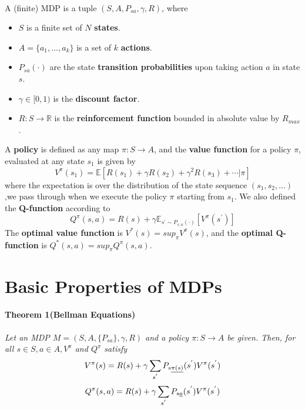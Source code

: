 \documentclass[12pt,a4paper]{article}
\begin{document}
\paragraph{} A (finite) MDP is a tuple $(S, A, {P_{sa}}, \gamma, R)$, where
\begin{itemize}
	\item $S$ is a finite set of $N$ \textbf{states}.
	\item $A = \{a_{1}, ..., a_{k}\}$ is a set of $k$ \textbf{actions}.
	\item $P_{sa}(\cdot)$ are the state \textbf{transition probabilities} upon taking action $a$ in state $s$.
	\item $\gamma \in [0, 1)$ is the \textbf{discount factor}.
	\item $R : S \rightarrow \mathbb{R}$ is the \textbf{reinforcement function} bounded in absolute value by $R_{max}$.
\end{itemize}
A \textbf{policy} is defined as any map $\pi : S \rightarrow A$, and the \textbf{value function} for a policy $\pi$, evaluated at any state $s_{1}$ is given by 
\begin{equation}
V^{\pi}(s_{1}) = \mathbb{E}[R(s_{1}) + \gamma R(s_{2}) + \gamma^{2} R(s_{3}) + \cdots | \pi]
\end{equation}
where the expectation is over the distribution of the state sequence $(s_1, s_2, ...)$,we pass through when we execute the policy $\pi$ starting from $s_1$. We also defined the \textbf{Q-function} according to 
\begin{equation}
	Q^{\pi}(s,a) = R(s) + \gamma \mathbb{E}_{s^{'} \sim P_{s,a}(\cdot)}[V^{\pi}(s^{'})]
\end{equation}
The \textbf{optimal value function} is $V^{*}(s) = sup_{\pi}V^{\pi}(s)$, and the \textbf{optimal Q-function} is $Q^{*}(s,a)= sup_{\pi}Q^{\pi}(s,a)$.
\section{Basic Properties of MDPs}
\paragraph{Theorem 1(Bellman Equations)} \textit{Let an MDP $M = (S,A, \{P_{sa}\}, \gamma, R)$ and a policy $\pi : S \rightarrow A$ be given. Then, for all $s \in S, a \in A, V^{\pi}$ and $Q^{\pi}$ satisfy}
\begin{equation}
	V^{\pi}(s) = R(s) + \gamma \sum\limits_{s^{'}}P_{s\uline{\pi(s)}}(s^{'})V^{\pi}(s^{'})
\end{equation} 
\begin{equation}
	Q^{\pi}(s,a) = R(s) + \gamma \sum\limits_{s^{'}}P_{s\uline{a}}(s^{'})V^{\pi}(s^{'})
\end{equation}
\end{document}
